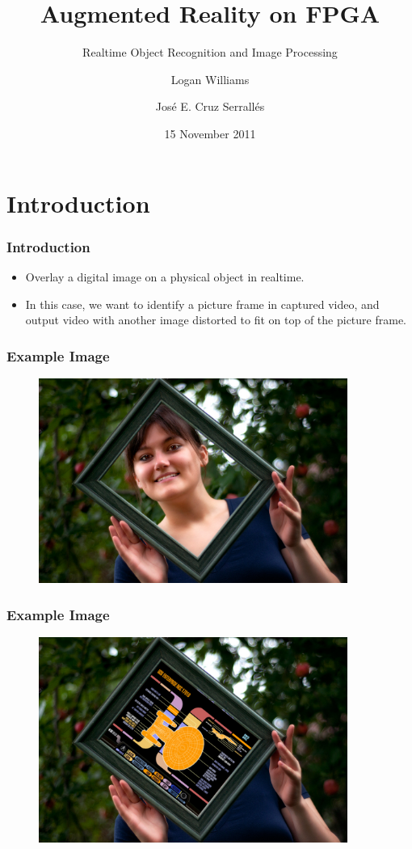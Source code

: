 \documentclass{beamer}
\title[Augmented Reality on FPGA]{Augmented Reality on FPGA}
\subtitle{Realtime Object Recognition and Image Processing}
\author[Logan Williams \and Jos\'{e} Cruz Serrall\'{e}s]{Logan Williams \and Jos\'{e} E. Cruz Serrall\'{e}s}
\date{15 November 2011}
\institute[6.111]{6.111 Fall 2011}
\begin{document}
\begin{frame}
	\titlepage
\end{frame}

\section{Introduction}
\begin{frame}
	\frametitle{Introduction}
	\begin{itemize}
		\item Overlay a digital image on a physical object in realtime.
		\item In this case, we want to identify a picture frame in captured video, and output video with another image distorted to fit on top of the picture frame.
	\end{itemize}
\end{frame}

\begin{frame}
	\frametitle{Example Image}
	\begin{figure}
		\centering
		\includegraphics[width=0.9\textwidth]{images/example/example1.png}
	\end{figure}
\end{frame}

\begin{frame}
	\frametitle{Example Image}
	\begin{figure}
		\centering
		\includegraphics[width=0.9\textwidth]{images/example/example2.jpg}
	\end{figure}
\end{frame}
\end{document}

